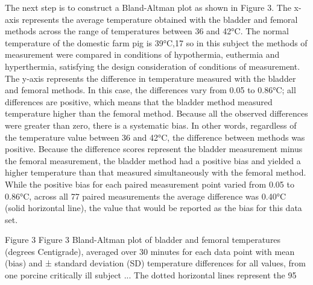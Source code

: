 \documentclass[]{article}
\begin{document}
The next step is to construct a Bland-Altman plot as shown in Figure 3. The x-axis represents the average temperature obtained with the bladder and femoral methods across the range of temperatures between 36 and 42°C. The normal temperature of the domestic farm pig is 39°C,17 so in this subject the methods of measurement were compared in conditions of hypothermia, euthermia and hyperthermia, satisfying the design consideration of conditions of measurement. The y-axis represents the difference in temperature measured with the bladder and femoral methods. In this case, the differences vary from 0.05 to 0.86°C; all differences are positive, which means that the bladder method measured temperature higher than the femoral method. Because all the observed differences were greater than zero, there is a systematic bias. In other words, regardless of the temperature value between 36 and 42°C, the difference between methods was positive. Because the difference scores represent the bladder measurement minus the femoral measurement, the bladder method had a positive bias and yielded a higher temperature than that measured simultaneously with the femoral method. While the positive bias for each paired measurement point varied from 0.05 to 0.86°C, across all 77 paired measurements the average difference was 0.40°C (solid horizontal line), the value that would be reported as the bias for this data set.

Figure 3
Figure 3
Bland-Altman plot of bladder and femoral temperatures (degrees Centigrade), averaged over 30 minutes for each data point with mean (bias) and ± standard deviation (SD) temperature differences for all values, from one porcine critically ill subject ...
The dotted horizontal lines represent the 95%
\end{document}
